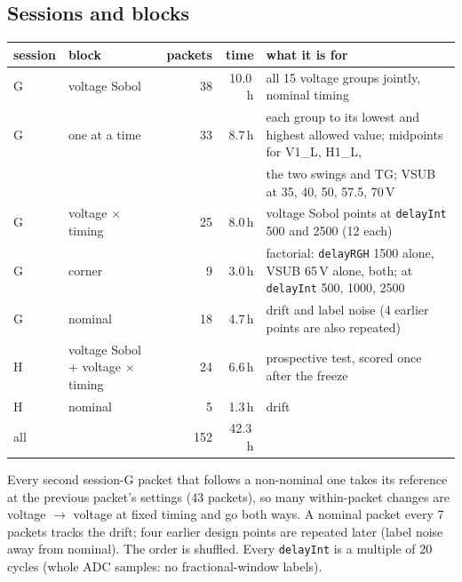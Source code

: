 \documentclass[11pt]{article}
\begin{document}
\subsection{Sessions and blocks}
\begin{center}
\begin{tabular}{llrrl}
\toprule
session & block & packets & time & what it is for\\
\midrule
G & voltage Sobol & 38 & 10.0\,h & all 15 voltage groups jointly, nominal timing\\
G & one at a time & 33 & 8.7\,h & each group to its lowest and highest allowed value; midpoints for V1\_L, H1\_L,\\
  & & & & the two swings and TG; VSUB at 35, 40, 50, 57.5, 70\,V\\
G & voltage $\times$ timing & 25 & 8.0\,h & voltage Sobol points at \texttt{delayInt} 500 and 2500 (12 each)\\
G & corner & 9 & 3.0\,h & factorial: \texttt{delayRGH} 1500 alone, VSUB 65\,V alone, both; at \texttt{delayInt} 500, 1000, 2500\\
G & nominal & 18 & 4.7\,h & drift and label noise (4 earlier points are also repeated)\\
H & voltage Sobol + voltage $\times$ timing & 24 & 6.6\,h & prospective test, scored once after the freeze\\
H & nominal & 5 & 1.3\,h & drift\\
\midrule
all & & 152 & 42.3\,h & \\
\bottomrule
\end{tabular}
\end{center}
Every second session-G packet that follows a non-nominal one takes its reference at the previous packet's settings
(43 packets), so many within-packet changes are voltage $\to$ voltage at fixed timing and go both ways. A nominal packet
every 7 packets tracks the drift; four earlier design points are repeated later (label noise away from nominal). The
order is shuffled. Every \texttt{delayInt} is a multiple of 20 cycles (whole ADC samples: no fractional-window labels).
\end{document}
